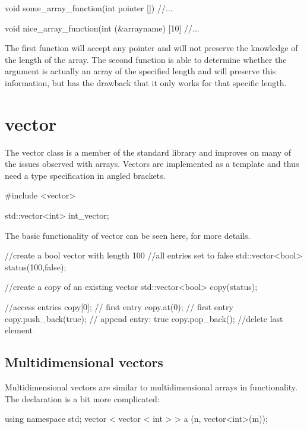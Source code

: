 \documentclass[10pt,a4paper]{scrartcl}
\begin{document}
\begin{multicols*}{2}
\begin{TPCpp}
void some_array_function(int pointer []){
	//...
}

void nice_array_function(int (&arrayname) [10]{
	//...
}
\end{TPCpp}

The first function will accept any pointer and will not preserve the knowledge of the length of the array. The second function is able to determine whether the argument is actually an array of the specified length and will preserve this information, but has the drawback that it only works for that specific length.

\section{vector}

The vector class is a member of the standard library and improves on many of the issues observed with arrays. Vectors are implemented as a template and thus need a type specification in angled brackets.

\begin{TPCpp}
#include <vector>

std::vector<int> int_vector;
\end{TPCpp}

The basic functionality of vector can be seen here,  for more details.

\begin{TPCpp}
//create a bool vector with length 100
//all entries set to false
std::vector<bool> status(100,false);

//create a copy of an existing vector
std::vector<bool> copy(status);

//access entries
copy[0]; // first entry
copy.at(0); // first entry
copy.push_back(true); // append entry: true
copy.pop_back(); //delete last element
\end{TPCpp}

\subsection{Multidimensional vectors}

Multidimensional vectors are similar to multidimensional arrays in functionality. The declaration is a bit more complicated:

\begin{TPCpp}
using namespace std;
vector < vector < int > > a (n, vector<int>(m));
\end{TPCpp}


\end{multicols*}
\end{document}
